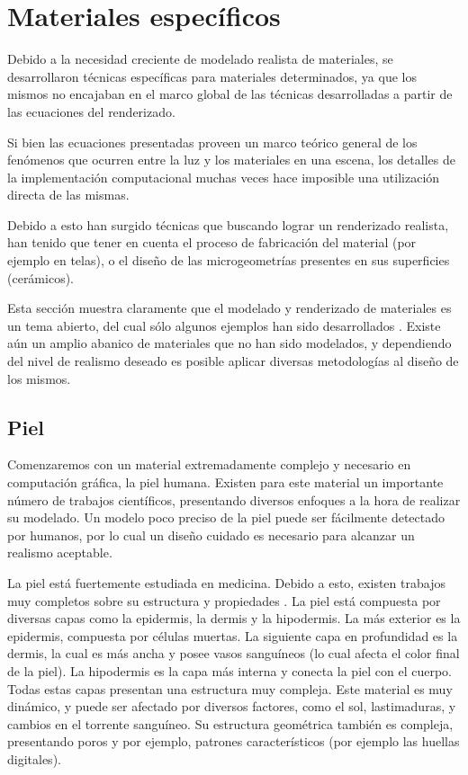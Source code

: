 \section{Materiales específicos}
Debido a la necesidad creciente de modelado realista de materiales, se desarrollaron técnicas específicas para materiales determinados, ya que los mismos no encajaban en el marco global de las técnicas desarrolladas a partir de las ecuaciones del renderizado.

Si bien las ecuaciones presentadas proveen un marco teórico general de los fenómenos que ocurren entre la luz y los materiales en una escena, los detalles de la implementación computacional muchas veces hace imposible una utilización directa de las mismas.

Debido a esto han surgido técnicas que buscando lograr un renderizado realista, han tenido que tener en cuenta el proceso de fabricación del material (por ejemplo en telas), o el diseño de las microgeometrías presentes en sus superficies (cerámicos).


Esta sección muestra claramente que el modelado y renderizado de materiales es un tema abierto, del cual sólo algunos ejemplos han sido desarrollados \cite{Dorsey2007}.
Existe aún un amplio abanico de materiales que no han sido modelados, y dependiendo del nivel de realismo deseado es posible aplicar diversas metodologías al diseño de los mismos.


\subsection{Piel}
Comenzaremos con un material extremadamente complejo y necesario en computación gráfica, la piel humana.
Existen para este material un importante número de trabajos científicos, presentando diversos enfoques a la hora de realizar su modelado.
Un modelo poco preciso de la piel puede ser fácilmente detectado por humanos, por lo cual un diseño cuidado es necesario para alcanzar un realismo aceptable.


La piel está fuertemente estudiada en medicina.
Debido a esto, existen trabajos muy completos sobre su estructura y propiedades \cite{Walters2002}.
La piel está compuesta por diversas capas como la epidermis, la dermis y la hipodermis.
La más exterior es la epidermis, compuesta por células muertas.
La siguiente capa en profundidad es la dermis, la cual es más ancha y posee vasos sanguíneos (lo cual afecta el color final de la piel).
La hipodermis es la capa más interna y conecta la piel con el cuerpo.
Todas estas capas presentan una estructura muy compleja.
Este material es muy dinámico, y puede ser afectado por diversos factores, como el sol, lastimaduras, y cambios en el torrente sanguíneo.
Su estructura geométrica también es compleja, presentando poros y por ejemplo, patrones característicos (por ejemplo las huellas digitales).

